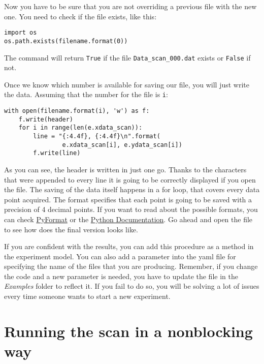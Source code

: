 Now you have to be sure that you are not overriding a previous file with
the new one. You need to check if the file exists, like this:

\begin{verbatim}
import os
os.path.exists(filename.format(0))
\end{verbatim}

The command will return \texttt{True} if the file
\texttt{Data_scan_000.dat} exists or \texttt{False} if not.


Once we know which number is available for saving our file, you will
just write the data. Assuming that the number for the file is
\texttt{i}:

\begin{verbatim}
with open(filename.format(i), 'w') as f:
    f.write(header)
    for i in range(len(e.xdata_scan)):
        line = "{:4.4f}, {:4.4f}\n".format(
                e.xdata_scan[i], e.ydata_scan[i])
        f.write(line)
\end{verbatim}

As you can see, the header is written in just one go. Thanks to the
\texttt{\n} characters that were appended to every line
it is going to be correctly displayed if you open the file. The saving
of the data itself happens in a for loop, that covers every data point
acquired. The format specifies that each point is going to be saved with
a precision of 4 decimal points. If you want to read about the possible
formats, you can check \href{https://pyformat.info/}{PyFormat} or the
\href{https://docs.python.org/3.6/library/stdtypes.html\#str.format}{Python
Documentation}. Go ahead and open the file to see how does the final
version looks like.

If you are confident with the results, you can add this procedure as a
method in the experiment model. You can also add a parameter into the
yaml file for specifying the name of the files that you are producing.
Remember, if you change the code and a new parameter is needed, you have
to update the file in the \emph{Examples} folder to reflect it. If you
fail to do so, you will be solving a lot of issues every time someone
wants to start a new experiment.

\section{Running the scan in a nonblocking way}\label{running-the-scan-in-a-nonblockingway}

